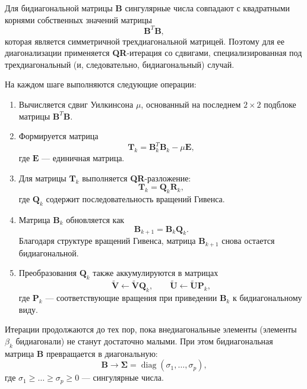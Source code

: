 \documentclass[12pt]{article}
\begin{document}
	Для бидиагональной матрицы $\mathbf{B}$ сингулярные числа совпадают 
	с квадратными корнями собственных значений матрицы
	\begin{equation}
	\mathbf{B}^{T}\mathbf{B},
\end{equation}
	которая является симметричной трехдиагональной матрицей. 
	Поэтому для ее диагонализации применяется \textbf{QR}-итерация со сдвигами,
	специализированная под трехдиагональный (и, следовательно, бидиагональный)
	случай.
	
	На каждом шаге выполняются следующие операции:
	
	\begin{enumerate}
		\item Вычисляется сдвиг Уилкинсона $\mu$, основанный на последнем 
		$2\times 2$ подблоке матрицы $\mathbf{B}^{T}\mathbf{B}$.
		\item Формируется матрица
	\begin{equation}
		\mathbf{T}_k = \mathbf{B}_k^{T}\mathbf{B}_k - \mu \mathbf{E},
	\end{equation}
		где $\mathbf{E}$ --- единичная матрица.
		\item Для матрицы $\mathbf{T}_k$ выполняется \textbf{QR}-разложение:
	\begin{equation}
		\mathbf{T}_k = \mathbf{Q}_k \mathbf{R}_k,
	\end{equation}
		где $\mathbf{Q}_k$ содержит последовательность вращений Гивенса.
		\item Матрица $\mathbf{B}_k$ обновляется как
		\begin{equation}
		\mathbf{B}_{k+1} = \mathbf{B}_{k} \mathbf{Q}_{k}.
	\end{equation}
		Благодаря структуре вращений Гивенса, матрица $\mathbf{B}_{k+1}$ 
		снова остается бидиагональной.
		\item Преобразования $\mathbf{Q}_{k}$ также аккумулируются в матрицах
		\begin{equation}
		\widetilde{\mathbf{V}} \gets \widetilde{\mathbf{V}} \mathbf{Q}_{k},
		\qquad
		\widetilde{\mathbf{U}} \gets \widetilde{\mathbf{U}} \mathbf{P}_{k},
	\end{equation}
		где $\mathbf{P}_{k}$ --- соответствующие вращения при приведении
		$\mathbf{B}_k$ к бидиагональному виду.
	\end{enumerate}
	
	Итерации продолжаются до тех пор, пока внедиагональные элементы 
	(элементы $\beta_{k}$ бидиагонали) не станут достаточно малыми. 
	При этом бидиагональная матрица $\mathbf{B}$ превращается в диагональную:
	\begin{equation}
	\mathbf{B} \longrightarrow 
	\boldsymbol{\Sigma} = \operatorname{diag}(\sigma_{1},\ldots,\sigma_{p}),
\end{equation}
	где $\sigma_{1}\geqslant\ldots\geqslant\sigma_{p}\ge 0$ --- сингулярные числа.
	
\end{document}
